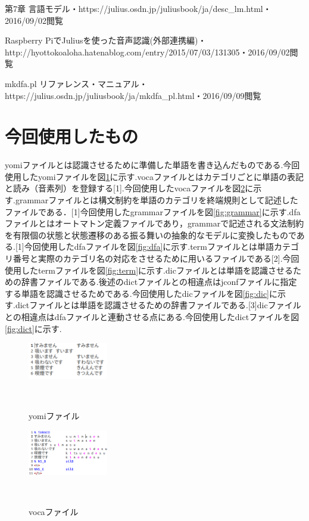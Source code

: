 \documentclass[a4paper]{jarticle}
\begin{document}
\begin{thebibliography}{1}
   第7章 言語モデル・https://julius.osdn.jp/juliusbook/ja/desc\_lm.html・2016/09/02閲覧


   Raspberry PiでJuliusを使った音声認識(外部連携編)・http://hyottokoaloha.hatenablog.com/entry/2015/07/03/131305・2016/09/02閲覧


   mkdfa.pl リファレンス・マニュアル・https://julius.osdn.jp/juliusbook/ja/mkdfa\_pl.html・2016/09/09閲覧


\appendix
\section{今回使用したもの}
yomiファイルとは認識させるために準備した単語を書き込んだものである.今回使用したyomiファイルを図\ref{fig:yomi}に示す.vocaファイルとはカテゴリごとに単語の表記と読み（音素列）を登録する[1].今回使用したvocaファイルを図\ref{fig:voca}に示す.grammarファイルとは構文制約を単語のカテゴリを終端規則として記述したファイルである．[1]今回使用したgrammarファイルを図\ref{fig:grammar}に示す.dfaファイルとはオートマトン定義ファイルであり，grammarで記述される文法制約を有限個の状態と状態遷移のある振る舞いの抽象的なモデルに変換したものである.[1]今回使用したdfaファイルを図\ref{fig:dfa}に示す.termファイルとは単語カテゴリ番号と実際のカテゴリ名の対応をさせるために用いるファイルである[2].今回使用したtermファイルを図\ref{fig:term}に示す.dicファイルとは単語を認識させるための辞書ファイルである.後述のdictファイルとの相違点はjconfファイルに指定する単語を認識させるためである.今回使用したdicファイルを図\ref{fig:dic}に示す.dictファイルとは単語を認識させるための辞書ファイルである.[3]dicファイルとの相違点はdfaファイルと連動させる点にある.今回使用したdictファイルを図\ref{fig:dict}に示す.


\begin{figure}[h]
 \begin{center}
  \includegraphics[width=35mm]{img/yomi.png}
 　\caption{yomiファイル}
 　\label{fig:yomi}
 \end{center}
\end{figure}


\begin{figure}[h]
 \begin{center}
  \includegraphics[width=35mm]{img/voca.png}
 　\caption{vocaファイル}
 　\label{fig:voca}
 \end{center}
\end{figure}



\end{thebibliography}
\end{document}
